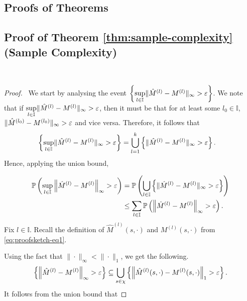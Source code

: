 \documentclass[opre,sglanonrev]{informs4}
\numberwithin{equation}{section}
\newcommand{\pow}[1]{^{(#1)}}
\newcommand{\lc}{\left\{}
\newcommand{\rc}{\right\}}
\newcommand{\Ibb}{\mathbb{I}}
\newcommand{\Pbb}{\mathbb{P}}
\newcommand{\hatmls}{\Hat{M}^{(l)}(s,\cdot)}
\newcommand{\mls}{{M}^{(l)}(s,\cdot)}
\newcommand{\prob}{\Pbb}
\newcommand{\eps}{\varepsilon}
\renewcommand{\epsilon}{\eps}
\begin{document}
\begin{APPENDICES}
\section{Proofs of Theorems}
\subsection{Proof of Theorem \ref{thm:sample-complexity} (Sample Complexity)}~\label{sec:prf-sampcomp}
\begin{proof} \ 
We start by analysing the event $\lc \underset{l\in \Ibb}{\sup} \|\Hat{M}^{(l)}-M^{(l)}\|_{\infty}>\epsilon \rc$. 
We note that if $\underset{l\in \Ibb}{\sup} \|\Hat{M}^{(l)}-M^{(l)}\|_{\infty}>\epsilon$, then it must be that for at least some $l_0\in \Ibb$, $\|\Hat{M}^{(l_0)}-M^{(l_0)}\|_{\infty}>\epsilon$ and vice versa. Therefore, it follows that
\begin{align*}
    \lc \underset{l\in \Ibb}{\sup} \|\Hat{M}^{(l)}-M^{(l)}\|_{\infty}>\epsilon \rc & = \bigcup_{l=1}^k \lc  \|\Hat{M}^{(l)}-M^{(l)}\|_{\infty}>\epsilon \rc.
\end{align*}
Hence, applying the union bound,

\begin{align}
    \prob\left(\underset{l\in \Ibb}{\sup} \left\|\Hat{M}^{(l)}-M^{(l)} \right\|_{\infty}>\epsilon  \right) & = \prob\left( \bigcup_{l\in\Ibb} \lc  \|\Hat{M}^{(l)}-M^{(l)}\|_{\infty}>\epsilon \rc\right)\\
    & \leq \sum_{l\in \Ibb}\prob\left(\left\|\Hat{M}^{(l)}-M^{(l)}\right\|_{\infty}>\epsilon  \right).
\end{align}
Fix $l\in \Ibb$. Recall the definition of $\hat M\pow{l}(s,\cdot)$ and $\mls$ from \cref{eq:proofsketch-eq1}. 

Using the fact that $\|\cdot\|_{\infty}<\|\cdot\|_1$, we get the following.
\[
    \lc \left\|\Hat{M}^{(l)}-M^{(l)}\right\|_{\infty}> \epsilon \rc \subseteq \bigcup_{s\in \chi}\lc \left\|\hatmls-\mls\right\|_{1}>\epsilon\rc.
\]
It follows from the union bound that


\end{proof}
\end{APPENDICES}
\end{document}

